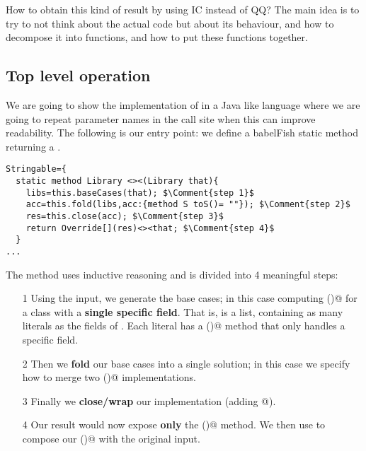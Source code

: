 How to obtain this kind of result by using IC instead of QQ?
The main idea is to try to not think about the actual code but about
its behaviour, and how to decompose it into functions, and how to
put these functions together.



\subsection*{Top level operation}
We are going to show the implementation of \Q@Stringable@ in a Java like language where
we are going to repeat parameter names in the call site when this can improve readability.
The following is our entry point: we define a babelFish static method
returning a \Q@Library@.

\saveSpace
\begin{lstlisting}
Stringable={
  static method Library <><(Library that){
    libs=this.baseCases(that); $\Comment{step 1}$
    acc=this.fold(libs,acc:{method S toS()= ""}); $\Comment{step 2}$
    res=this.close(acc); $\Comment{step 3}$
    return Override[](res)<><that; $\Comment{step 4}$
  }
...
\end{lstlisting}
\saveSpace


\noindent
The method uses inductive reasoning and is divided into 4 meaningful steps:
\begin{itemize}
\item[1] Using the input, we generate the base cases;
in this case computing \Q@toS()@ for a class with a \textbf{single specific field}.
That is, \Q@libs@ is a list, containing 
as many \Q@Library@ literals as the fields of \Q@that@.
Each literal has a \Q@toS()@ method that only handles a specific field.
\item[2] Then we  \textbf{fold} our base cases into a single solution; in this case we specify how to merge two \Q@toS()@ implementations.
\item[3] Finally we \textbf{close/wrap} our implementation (adding  \Q@[]@).
\item[4]
Our result \Q@res@ would now expose \textbf{only} the \Q@toS()@ method.
We then use \Q@Override@ to compose our \Q@toS()@ with the original input.
\end{itemize}

